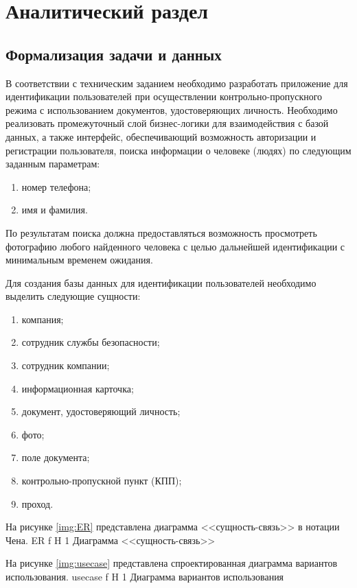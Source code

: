 \chapter{Аналитический раздел}

\section{Формализация задачи и данных}

В соответствии с техническим заданием необходимо разработать приложение для идентификации пользователей при осуществлении контрольно-пропускного режима с использованием документов, удостоверяющих личность.
Необходимо реализовать промежуточный слой бизнес-логики для взаимодействия с базой данных, а также интерфейс, обеспечивающий возможность авторизации и регистрации пользователя, поиска информации о человеке (людях) по следующим заданным параметрам:
\begin{enumerate}
	\item номер телефона;
	\item имя и фамилия.
\end{enumerate}
По результатам поиска должна предоставляться возможность просмотреть фотографию любого найденного человека с целью дальнейшей идентификации с минимальным временем ожидания.

Для создания базы данных для идентификации пользователей необходимо выделить следующие сущности:
\begin{enumerate}
	\item компания;
	\item сотрудник службы безопасности;
	\item сотрудник компании;
	\item информационная карточка;
	\item документ, удостоверяющий личность;
	\item фото;
	\item поле документа;
	\item контрольно-пропускной пункт (КПП);
	\item проход.
\end{enumerate}

На рисунке \ref{img:ER} представлена диаграмма <<сущность-связь>> в нотации Чена.
	{ER}
	{f}
	{H}
	{1\textwidth}
	{Диаграмма <<сущность-связь>>}

На рисунке \ref{img:usecase} представлена спроектированная диаграмма вариантов использования.
	{usecase}
	{f}
	{H}
	{1\textwidth}
	{Диаграмма вариантов использования}

